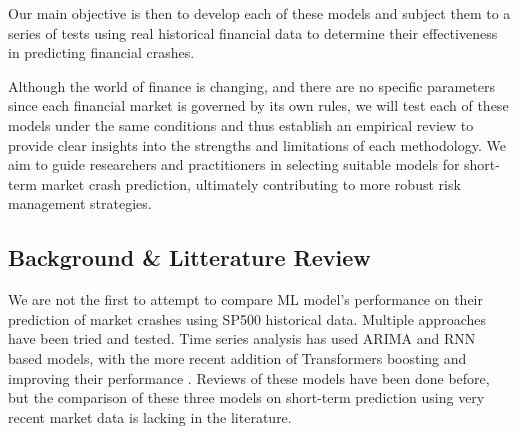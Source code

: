\documentclass[12pt, letterpaper]{article}
\begin{document}
Our main objective is then to develop each of these models and subject them to a series of tests using real historical financial data to determine their effectiveness in predicting financial crashes. 

Although the world of finance is changing, and there are no specific parameters since each financial market is governed by its own rules, we will test each of these models under the same conditions and thus establish an empirical review to provide clear insights into the strengths and limitations of each methodology. We aim to guide researchers and practitioners in selecting suitable models for short-term market crash prediction, ultimately contributing to more robust risk management strategies.



\subsection*{Background \& Litterature Review}
    We are not the first to attempt to compare ML model's performance on their prediction of market crashes using SP500 historical data. 
    Multiple approaches have been tried and tested. Time series analysis has used ARIMA and RNN based models, with the more recent addition of Transformers boosting and improving their performance  \cite{Okpeke, Ahmed, ArunKumar}. 
    Reviews of these models have been done before, but the comparison of these three models on short-term prediction using very recent market data is lacking in the literature. 
    \\
\\
\end{document}
